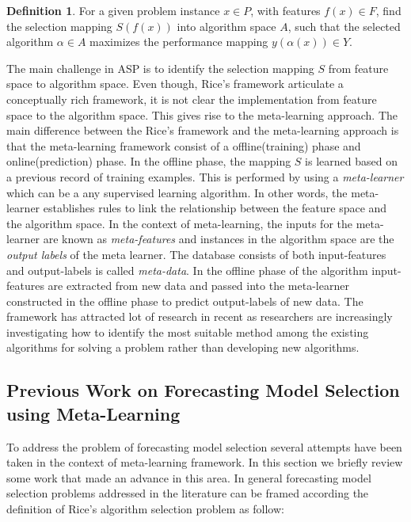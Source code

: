 \documentclass[11pt,]{article}
\theoremstyle{definition}
\newtheorem{definition}{Definition}[section]
\theoremstyle{definition}
\theoremstyle{definition}
\theoremstyle{remark}
\begin{document}
\begin{definition}
\label{def2}
For a given problem instance $x \in P$, with features $f(x) \in F$, find the selection mapping $S(f(x))$ into algorithm space $A$, such that the selected algorithm $\alpha \in A$ maximizes the performance mapping $y(\alpha(x)) \in Y$.
\end{definition}

The main challenge in ASP is to identify the selection mapping \(S\)
from feature space to algorithm space. Even though, Rice's framework
articulate a conceptually rich framework, it is not clear the
implementation from feature space to the algorithm space. This gives
rise to the meta-learning approach. The main difference between the
Rice's framework and the meta-learning approach is that the
meta-learning framework consist of a offline(training) phase and
online(prediction) phase. In the offline phase, the mapping \(S\) is
learned based on a previous record of training examples. This is
performed by using a \emph{meta-learner} which can be a any supervised
learning algorithm. In other words, the meta-learner establishes rules
to link the relationship between the feature space and the algorithm
space. In the context of meta-learning, the inputs for the meta-learner
are known as \emph{meta-features} and instances in the algorithm space
are the \emph{output labels} of the meta learner. The database consists
of both input-features and output-labels is called \emph{meta-data}. In
the offline phase of the algorithm input-features are extracted from new
data and passed into the meta-learner constructed in the offline phase
to predict output-labels of new data. The framework has attracted lot of
research in recent as researchers are increasingly investigating how to
identify the most suitable method among the existing algorithms for
solving a problem rather than developing new algorithms.

\subsection{Previous Work on Forecasting Model Selection using
Meta-Learning}\label{previous-work-on-forecasting-model-selection-using-meta-learning}

To address the problem of forecasting model selection several attempts
have been taken in the context of meta-learning framework. In this
section we briefly review some work that made an advance in this area.
In general forecasting model selection problems addressed in the
literature can be framed according the definition of Rice's algorithm
selection problem as follow:
\end{document}
